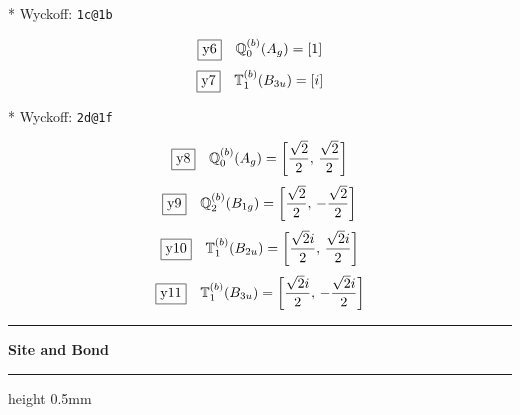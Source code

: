\documentclass[fleqn,10pt,landscape]{jsarticle}
\begin{document}
\noindent ** Wyckoff: \texttt{1c@1b}

\begin{dmath*}
\fbox{y6}\quad \mathbb{Q}_{0}^{(b)}(A_{g})=\left[ 1 \right]
\end{dmath*}
\begin{dmath*}
\fbox{y7}\quad \mathbb{T}_{1}^{(b)}(B_{3u})=\left[ i \right]
\end{dmath*}
\vspace{5mm}

\noindent ** Wyckoff: \texttt{2d@1f}

\begin{dmath*}
\fbox{y8}\quad \mathbb{Q}_{0}^{(b)}(A_{g})=\left[ \frac{\sqrt{2}}{2},\, \frac{\sqrt{2}}{2} \right]
\end{dmath*}
\begin{dmath*}
\fbox{y9}\quad \mathbb{Q}_{2}^{(b)}(B_{1g})=\left[ \frac{\sqrt{2}}{2},\, - \frac{\sqrt{2}}{2} \right]
\end{dmath*}
\begin{dmath*}
\fbox{y10}\quad \mathbb{T}_{1}^{(b)}(B_{2u})=\left[ \frac{\sqrt{2} i}{2},\, \frac{\sqrt{2} i}{2} \right]
\end{dmath*}
\begin{dmath*}
\fbox{y11}\quad \mathbb{T}_{1}^{(b)}(B_{3u})=\left[ \frac{\sqrt{2} i}{2},\, - \frac{\sqrt{2} i}{2} \right]
\end{dmath*}
\vspace{5mm}
\noindent \rule[0.5mm]{5mm}{0.5mm}\hspace{3mm}\textbf{Site and Bond}\hspace{3mm}\leaders\hrule height 0.5mm\hfill\kern0pt
\vspace{3mm}
\end{document}

